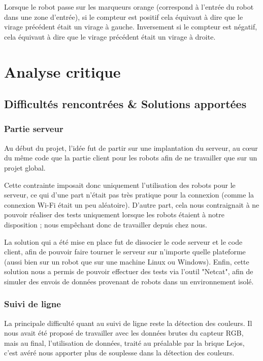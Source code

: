 \documentclass[french,a4paper,12pt]{report}
\begin{document}
Lorsque le robot passe sur les marqueurs orange (correspond à l’entrée du robot dans une zone d’entrée), si le compteur est positif cela équivaut à dire que le virage précédent était un virage à gauche. Inversement si le compteur est négatif, cela équivaut à dire que le virage précédent était un virage à droite.

\part{Analyse critique}

\chapter{Difficultés rencontrées \& Solutions apportées}

\section{Partie serveur}
Au début du projet, l’idée fut de partir sur une implantation du serveur, au cœur du même code que la partie client pour les robots afin de ne travailler que sur un projet global.

Cette contrainte imposait donc uniquement l’utilisation des robots pour le serveur, ce qui d’une part n’était pas très pratique pour la connexion (comme la connexion Wi-Fi était un peu aléatoire).
D’autre part, cela nous contraignait à ne pouvoir réaliser des tests uniquement lorsque les robots étaient à notre disposition ; nous empêchant donc de travailler depuis chez nous.

La solution qui a été mise en place fut de dissocier le code serveur et le code client, afin de pouvoir faire tourner le serveur sur n’importe quelle plateforme (aussi bien sur un robot que sur une machine Linux ou Windows).
Enfin, cette solution nous a permis de pouvoir effectuer des tests via l'outil "Netcat", afin de simuler des envois de données provenant de robots dans un environnement isolé.

\section{Suivi de ligne}
La principale difficulté quant au suivi de ligne reste la détection des couleurs. Il nous avait été proposé de travailler avec les données brutes du capteur RGB, mais au final, l'utilisation de données, traité au préalable par la brique Lejos, c'est avéré nous apporter plus de souplesse dans la détection des couleurs.
\newpage
\end{document}
